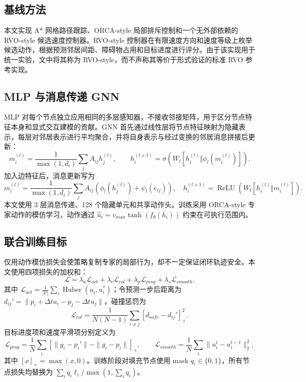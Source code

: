 \documentclass[UTF8,a4paper,11pt]{ctexart}
\begin{document}
\subsection{基线方法}
本文实现 A* 网格路径跟踪、ORCA-style 局部排斥控制和一个无外部依赖的 RVO-style 候选速度控制器。RVO-style 控制器在有限速度方向和速度等级上枚举候选动作，根据预测邻居间距、障碍物占用和目标进度进行评分。由于该实现用于统一实验，文中将其称为 RVO-style，而不声称其等价于形式验证的标准 RVO 参考实现。

\subsection{MLP 与消息传递 GNN}
MLP 对每个节点独立应用相同的多层感知器，不接收邻接矩阵，用于区分节点特征本身和显式交互建模的贡献。GNN 首先通过线性层将节点特征映射为隐藏表示，每层对邻居表示进行平均聚合，并将自身表示与经过变换的邻居消息拼接后更新：
\begin{equation}
m_i^{(l)}=\frac{1}{\max(1,d_i)}\sum_j A_{ij}h_j^{(l)},\qquad
h_i^{(l+1)}=\sigma\left(W_l[h_i^{(l)}\Vert\phi_l(m_i^{(l)})]\right).
\end{equation}
加入边特征后，消息更新写为
\begin{equation}
 m_i^{(l)}=\frac{1}{\max(1,d_i)}\sum_j A_{ij}\left(\phi_l(h_j^{(l)})+\psi_l(e_{ij})\right),
 \quad h_i^{(l+1)}=\operatorname{ReLU}\left(W_l[h_i^{(l)}\Vert m_i^{(l)}]\right).
\end{equation}
本文使用 3 层消息传递、128 个隐藏单元和共享动作头。训练采用 ORCA-style 专家动作的模仿学习，动作通过 $\hat u_i=v_{max}\tanh(f_\theta(h_i))$ 约束在可执行范围内。

\subsection{联合训练目标}
仅用动作模仿损失会使策略复制专家的局部行为，却不一定保证闭环轨迹安全。本文使用四项损失的加权和：
\begin{equation}
 \mathcal{L}=\lambda_a\mathcal{L}_{act}+\lambda_c\mathcal{L}_{col}+\lambda_p\mathcal{L}_{prog}+\lambda_s\mathcal{L}_{smooth}.
\end{equation}
其中 $\mathcal{L}_{act}=\frac{1}{|\mathcal V|}\sum_i\operatorname{Huber}(u_i,u_i^*)$；令预测一步后距离为 $d_{ij}'=\|p_i+\Delta t u_i-p_j-\Delta t u_j\|$，碰撞惩罚为
\begin{equation}
 \mathcal{L}_{col}=\frac{1}{N(N-1)}\sum_{i\ne j}[d_{safe}-d_{ij}']_+^2.
\end{equation}
目标进度项和速度平滑项分别定义为
\begin{equation}
 \mathcal{L}_{prog}=\frac{1}{N}\sum_i[\|g_i-p_i'\|-\|g_i-p_i\|]_+,\qquad
 \mathcal{L}_{smooth}=\frac{1}{N}\sum_i\|u_i^t-u_i^{t-1}\|_2^2,
\end{equation}
其中 $[x]_+=\max(x,0)$。训练阶段对填充节点使用 mask $q_i\in\{0,1\}$，所有节点损失均替换为 $\sum_iq_i\ell_i/\max(1,\sum_iq_i)$。
\end{document}
